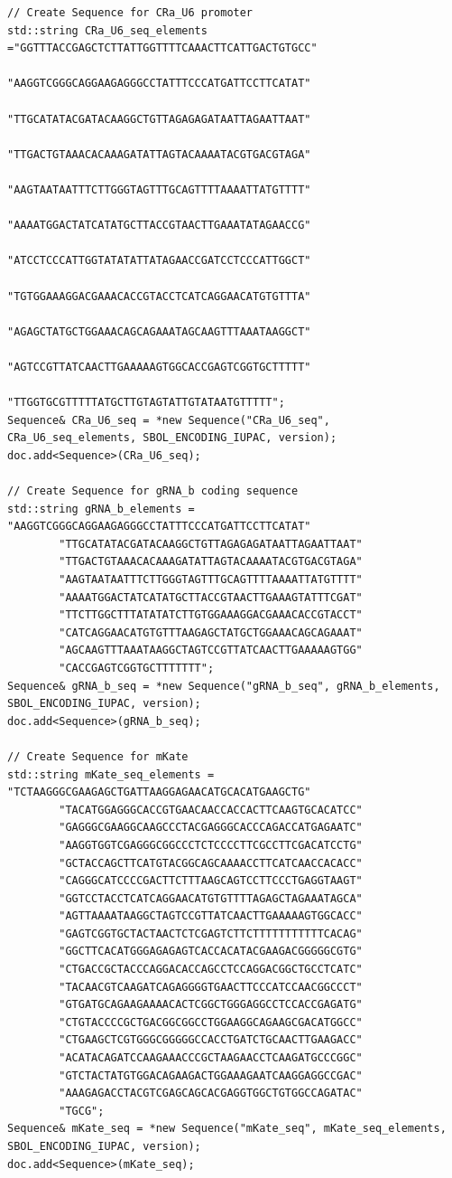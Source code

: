 \vspace{\abovedisplayskip}
\begin{minipage}{0.95\textwidth}%
\begin{lstlisting}[basicstyle=\tt\footnotesize]
// Create Sequence for CRa_U6 promoter
std::string CRa_U6_seq_elements ="GGTTTACCGAGCTCTTATTGGTTTTCAAACTTCATTGACTGTGCC" 
										"AAGGTCGGGCAGGAAGAGGGCCTATTTCCCATGATTCCTTCATAT" 
										"TTGCATATACGATACAAGGCTGTTAGAGAGATAATTAGAATTAAT" 
										"TTGACTGTAAACACAAAGATATTAGTACAAAATACGTGACGTAGA" 
										"AAGTAATAATTTCTTGGGTAGTTTGCAGTTTTAAAATTATGTTTT" 
										"AAAATGGACTATCATATGCTTACCGTAACTTGAAATATAGAACCG" 
										"ATCCTCCCATTGGTATATATTATAGAACCGATCCTCCCATTGGCT" 
										"TGTGGAAAGGACGAAACACCGTACCTCATCAGGAACATGTGTTTA" 
										"AGAGCTATGCTGGAAACAGCAGAAATAGCAAGTTTAAATAAGGCT" 
										"AGTCCGTTATCAACTTGAAAAAGTGGCACCGAGTCGGTGCTTTTT" 
										"TTGGTGCGTTTTTATGCTTGTAGTATTGTATAATGTTTTT";
Sequence& CRa_U6_seq = *new Sequence("CRa_U6_seq", CRa_U6_seq_elements, SBOL_ENCODING_IUPAC, version);
doc.add<Sequence>(CRa_U6_seq);

// Create Sequence for gRNA_b coding sequence
std::string gRNA_b_elements = "AAGGTCGGGCAGGAAGAGGGCCTATTTCCCATGATTCCTTCATAT" 
		"TTGCATATACGATACAAGGCTGTTAGAGAGATAATTAGAATTAAT" 
		"TTGACTGTAAACACAAAGATATTAGTACAAAATACGTGACGTAGA" 
		"AAGTAATAATTTCTTGGGTAGTTTGCAGTTTTAAAATTATGTTTT" 
		"AAAATGGACTATCATATGCTTACCGTAACTTGAAAGTATTTCGAT" 
		"TTCTTGGCTTTATATATCTTGTGGAAAGGACGAAACACCGTACCT" 
		"CATCAGGAACATGTGTTTAAGAGCTATGCTGGAAACAGCAGAAAT" 
		"AGCAAGTTTAAATAAGGCTAGTCCGTTATCAACTTGAAAAAGTGG" 
		"CACCGAGTCGGTGCTTTTTTT";
Sequence& gRNA_b_seq = *new Sequence("gRNA_b_seq", gRNA_b_elements, SBOL_ENCODING_IUPAC, version);
doc.add<Sequence>(gRNA_b_seq);

// Create Sequence for mKate
std::string mKate_seq_elements = "TCTAAGGGCGAAGAGCTGATTAAGGAGAACATGCACATGAAGCTG" 
		"TACATGGAGGGCACCGTGAACAACCACCACTTCAAGTGCACATCC" 
		"GAGGGCGAAGGCAAGCCCTACGAGGGCACCCAGACCATGAGAATC" 
		"AAGGTGGTCGAGGGCGGCCCTCTCCCCTTCGCCTTCGACATCCTG" 
		"GCTACCAGCTTCATGTACGGCAGCAAAACCTTCATCAACCACACC" 
		"CAGGGCATCCCCGACTTCTTTAAGCAGTCCTTCCCTGAGGTAAGT" 
		"GGTCCTACCTCATCAGGAACATGTGTTTTAGAGCTAGAAATAGCA" 
		"AGTTAAAATAAGGCTAGTCCGTTATCAACTTGAAAAAGTGGCACC" 
		"GAGTCGGTGCTACTAACTCTCGAGTCTTCTTTTTTTTTTTCACAG" 
		"GGCTTCACATGGGAGAGAGTCACCACATACGAAGACGGGGGCGTG" 
		"CTGACCGCTACCCAGGACACCAGCCTCCAGGACGGCTGCCTCATC" 
		"TACAACGTCAAGATCAGAGGGGTGAACTTCCCATCCAACGGCCCT" 
		"GTGATGCAGAAGAAAACACTCGGCTGGGAGGCCTCCACCGAGATG" 
		"CTGTACCCCGCTGACGGCGGCCTGGAAGGCAGAAGCGACATGGCC" 
		"CTGAAGCTCGTGGGCGGGGGCCACCTGATCTGCAACTTGAAGACC" 
		"ACATACAGATCCAAGAAACCCGCTAAGAACCTCAAGATGCCCGGC" 
		"GTCTACTATGTGGACAGAAGACTGGAAAGAATCAAGGAGGCCGAC" 
		"AAAGAGACCTACGTCGAGCAGCACGAGGTGGCTGTGGCCAGATAC" 
		"TGCG";
Sequence& mKate_seq = *new Sequence("mKate_seq", mKate_seq_elements, SBOL_ENCODING_IUPAC, version);
doc.add<Sequence>(mKate_seq);


\end{lstlisting}
\end{minipage}
